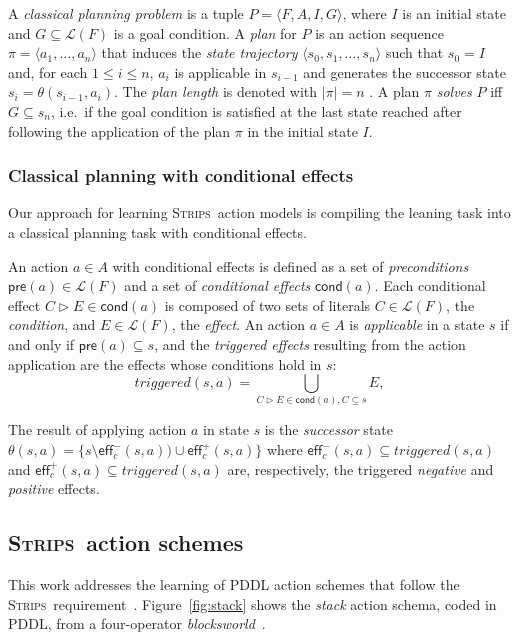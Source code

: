 \documentclass{article}
\newcommand{\tup}[1]{{\langle #1 \rangle}}
\newcommand{\pre}{\mathsf{pre}}     %
\newcommand{\eff}{\mathsf{eff}}     %
\newcommand{\cond}{\mathsf{cond}}   %
\newcommand{\strips}{\textsc{Strips}}     %
\begin{document}
A {\em classical planning problem} is a tuple $P=\tup{F,A,I,G}$, where $I$ is an initial state and $G\subseteq\mathcal{L}(F)$ is a goal condition. A {\em plan} for $P$ is an action sequence $\pi=\tup{a_1, \ldots, a_n}$ that induces the {\em state trajectory} $\tup{s_0, s_1, \ldots, s_n}$ such that $s_0=I$ and, for each {\small $1\leq i\leq n$}, $a_i$ is applicable in $s_{i-1}$ and generates the successor state $s_i=\theta(s_{i-1},a_i)$. The {\em plan length} is denoted with $|\pi|=n$ . A plan $\pi$ {\em solves} $P$ iff $G\subseteq s_n$, i.e.~if the goal condition is satisfied at the last state reached after following the application of the plan $\pi$ in the initial state $I$.


\subsubsection{Classical planning with conditional effects}
Our approach for learning \strips\ action models is compiling the leaning task into a classical planning task with conditional effects.

An action $a\in A$ with conditional effects is defined as a set of {\em preconditions} $\pre(a)\in\mathcal{L}(F)$ and a set of {\em conditional effects} $\cond(a)$. Each conditional effect $C\rhd E\in\cond(a)$ is composed of two sets of literals $C\in\mathcal{L}(F)$, the {\em condition}, and $E\in\mathcal{L}(F)$, the {\em effect}. An action $a\in A$ is {\em applicable} in a state $s$ if and only if $\pre(a)\subseteq s$, and the {\em triggered effects} resulting from the action application are the effects whose conditions hold in $s$:
\[
triggered(s,a)=\bigcup_{C\rhd E\in\cond(a),C\subseteq s} E,
\]

The result of applying action $a$ in state $s$ is the {\em successor} state $\theta(s,a)=\{s\setminus\eff_c^-(s,a))\cup\eff_c^+(s,a)\}$ where $\eff_c^-(s,a)\subseteq triggered(s,a)$ and $\eff_c^+(s,a)\subseteq triggered(s,a)$ are, respectively, the triggered {\em negative} and {\em positive} effects.


\subsection{\strips\ action schemes}
This work addresses the learning of PDDL action schemes that follow the \strips\ requirement~\cite{mcdermott1998pddl,fox2003pddl2}. Figure~\ref{fig:stack} shows the {\em stack} action schema, coded in PDDL, from a four-operator {\em blocksworld}~\cite{slaney2001blocks}.
\end{document}
